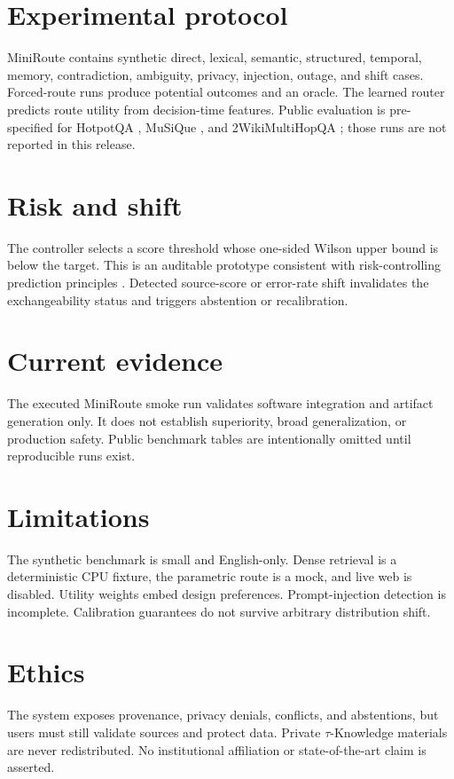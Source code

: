 \documentclass[11pt]{article}
\begin{document}
\section{Experimental protocol}
MiniRoute contains synthetic direct, lexical, semantic, structured, temporal, memory,
contradiction, ambiguity, privacy, injection, outage, and shift cases. Forced-route runs produce
potential outcomes and an oracle. The learned router predicts route utility from decision-time
features. Public evaluation is pre-specified for HotpotQA \cite{yang2018hotpotqa}, MuSiQue
\cite{trivedi2022musique}, and 2WikiMultiHopQA \cite{ho2020wiki}; those runs are not reported in
this release.

\section{Risk and shift}
The controller selects a score threshold whose one-sided Wilson upper bound is below the target.
This is an auditable prototype consistent with risk-controlling prediction principles
\cite{bates2021distribution}. Detected source-score or error-rate shift invalidates the
exchangeability status and triggers abstention or recalibration.

\section{Current evidence}
The executed MiniRoute smoke run validates software integration and artifact generation only.
It does not establish superiority, broad generalization, or production safety. Public benchmark
tables are intentionally omitted until reproducible runs exist.

\section{Limitations}
The synthetic benchmark is small and English-only. Dense retrieval is a deterministic CPU
fixture, the parametric route is a mock, and live web is disabled. Utility weights embed design
preferences. Prompt-injection detection is incomplete. Calibration guarantees do not survive
arbitrary distribution shift.

\section{Ethics}
The system exposes provenance, privacy denials, conflicts, and abstentions, but users must still
validate sources and protect data. Private $\tau$-Knowledge materials are never redistributed.
No institutional affiliation or state-of-the-art claim is asserted.



\end{document}
